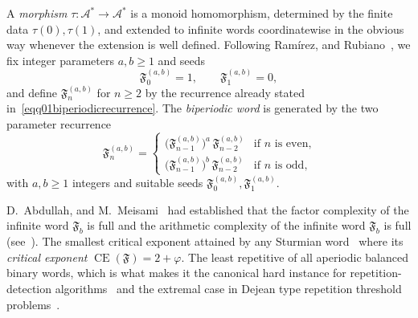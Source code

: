 \documentclass[12pt]{amsart}
\theoremstyle{plain}
\theoremstyle{definition}
\theoremstyle{remark}
\newcommand{\fphi}{\varphi}
\newcommand{\CE}{\operatorname{CE}}
\newcommand{\AlphA}{\mathcal{A}}
\newcommand{\FD}{\mathfrak{F}}
\begin{document}
A \emph{morphism} $\tau\colon\AlphA^{*}\to\AlphA^{*}$ is a monoid
homomorphism, determined by the finite data $\tau(0),\tau(1)$, and
extended to infinite words coordinatewise in the obvious way whenever
the extension is well defined. Following Ram\'irez, and Rubiano~\cite{Ramirez2015}, we fix integer parameters $a,b\ge1$ and seeds
\[
  \FD^{(a,b)}_0 = 1, \qquad \FD^{(a,b)}_1 = 0,
\]
and define $\FD^{(a,b)}_n$ for $n\geqslant 2$ by the recurrence already stated
in~\eqref{eqq01biperiodicrecurrence}. The
\emph{biperiodic word} is generated by the two parameter recurrence
\begin{equation}~\label{eqq01biperiodicrecurrence}
  \FD^{(a,b)}_n =
  \begin{cases}
    \bigl(\FD^{(a,b)}_{n-1}\bigr)^a\, \FD^{(a,b)}_{n-2} & \text{if } n \text{ is even},\\[4pt]
    \bigl(\FD^{(a,b)}_{n-1}\bigr)^b\, \FD^{(a,b)}_{n-2} & \text{if } n \text{ is odd},
  \end{cases}
\end{equation}
with $a,b\geqslant 1$ integers and suitable seeds $\FD^{(a,b)}_0,\FD^{(a,b)}_1$.


D.~Abdullah, and M.~Meisami~\cite{Abdullah2023Meisami} had  established that the factor complexity of the infinite word $\mathfrak{F}_b$ is full and the arithmetic complexity of the infinite word $\mathfrak{F}_b$ is full (see~\cite{Abdullah2025Hamoud}). 
The smallest critical exponent attained by any Sturmian word~\cite{Cassaigne2008, DamanikLenz2002, MousaviShallit2015} where its \emph{critical exponent} $\CE(\FD) = 2+\fphi$.
 The least repetitive of all aperiodic balanced binary
words, which is what makes it the canonical hard instance for
repetition-detection algorithms~\cite{AllouecheShallit2003} and the
extremal case in Dejean type repetition threshold
problems~\cite{CurrieRampersad2008}.

\medskip
\end{document}
